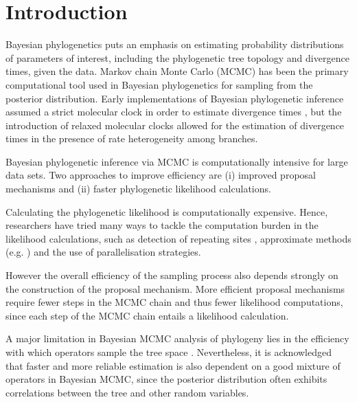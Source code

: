 \documentclass{bmcart}
\begin{document}

\section*{Introduction}
Bayesian phylogenetics puts an emphasis on estimating probability distributions of parameters of interest, including the phylogenetic tree topology and divergence times, given the data. 
Markov chain Monte Carlo (MCMC) has been the primary computational tool used in Bayesian phylogenetics for sampling from the posterior distribution. 
Early implementations of Bayesian phylogenetic inference assumed a strict molecular clock in order to estimate divergence times \cite{yang1997bayesian,rannala2003bayes}, but the introduction of relaxed molecular clocks allowed for the estimation of divergence times in the presence of rate heterogeneity among branches. 

Bayesian phylogenetic inference via MCMC is computationally intensive for large data sets. 
Two approaches to improve efficiency are (i) improved proposal mechanisms and (ii) faster phylogenetic likelihood calculations.

Calculating the phylogenetic likelihood is computationally expensive. 
Hence, researchers have tried many ways to tackle the computation burden in the likelihood calculations, such as detection of repeating sites \cite{kobert2017efficient},  approximate methods (e.g. \cite{reis2011approximate}) and the use of parallelisation strategies. 

However the overall efficiency of the sampling process also depends strongly on the construction of the proposal mechanism. 
More efficient proposal mechanisms require fewer steps in the MCMC chain and thus fewer likelihood computations, since each step of the MCMC chain entails a likelihood calculation. 

A major limitation in Bayesian MCMC analysis of phylogeny lies in the efficiency with which operators sample the tree space \cite{lakner2008efficiency}. 
Nevertheless, it is acknowledged that faster and more reliable estimation is also dependent on a good mixture of operators in Bayesian MCMC, since the posterior distribution often exhibits correlations between the tree and other random variables. 
\end{document}
